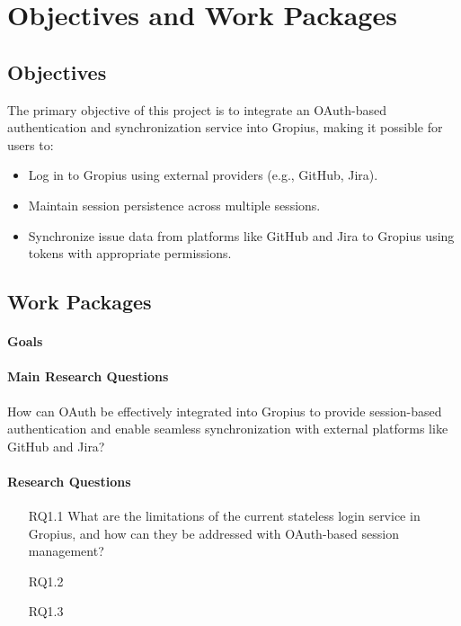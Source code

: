 
\chapter{Objectives and Work Packages}
\label{chap:wp}

\section{Objectives}

The primary objective of this project is to integrate an OAuth-based authentication and synchronization service into Gropius, making it possible for users to:
\begin{itemize}
	\item Log in to Gropius using external providers (e.g., GitHub, Jira).
	\item Maintain session persistence across multiple sessions.
	\item Synchronize issue data from platforms like GitHub and Jira to Gropius using tokens with appropriate permissions.
\end{itemize}

\section{Work Packages}
\label{sec-workpackages}



\subsubsection{Goals}

\subsubsection{Main Research Questions}


How can OAuth be effectively integrated into Gropius to provide session-based authentication and enable seamless synchronization
with external platforms like GitHub and Jira?


\subsubsection{Research Questions}
\begin{itemize}
	\item[RQ1.1]
What are the limitations of the current stateless login service in Gropius, and how can they be addressed with OAuth-based session management?
	\item[RQ1.2]
	\item[RQ1.3]
\end{itemize}

